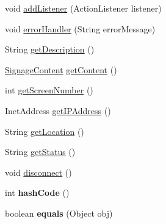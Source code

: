 \begin{DoxyCompactItemize}
\item 
void \hyperlink{classgov_1_1fnal_1_1ppd_1_1dd_1_1display_1_1DisplayImpl_ac26f8f2c8b7935585ee0c1f58a56ec4d}{add\-Listener} (Action\-Listener listener)
\item 
void \hyperlink{classgov_1_1fnal_1_1ppd_1_1dd_1_1display_1_1DisplayImpl_aef09d861c01a1be4e14a123d881bd211}{error\-Handler} (String error\-Message)
\item 
String \hyperlink{classgov_1_1fnal_1_1ppd_1_1dd_1_1display_1_1DisplayImpl_aa3ac511af5cffdea8fe664ec9f79e0c8}{get\-Description} ()
\item 
\hyperlink{interfacegov_1_1fnal_1_1ppd_1_1dd_1_1signage_1_1SignageContent}{Signage\-Content} \hyperlink{classgov_1_1fnal_1_1ppd_1_1dd_1_1display_1_1DisplayImpl_aa48e0f9679a07f8bff85867c4831d528}{get\-Content} ()
\item 
int \hyperlink{classgov_1_1fnal_1_1ppd_1_1dd_1_1display_1_1DisplayImpl_ac7077820239a58d29a1cb8d17666180e}{get\-Screen\-Number} ()
\item 
Inet\-Address \hyperlink{classgov_1_1fnal_1_1ppd_1_1dd_1_1display_1_1DisplayImpl_a76124d9580e72f645acb77257c033389}{get\-I\-P\-Address} ()
\item 
String \hyperlink{classgov_1_1fnal_1_1ppd_1_1dd_1_1display_1_1DisplayImpl_a092466ec2163d44dde2d737608360533}{get\-Location} ()
\item 
String \hyperlink{classgov_1_1fnal_1_1ppd_1_1dd_1_1display_1_1DisplayImpl_a3db5e11b8d5108d57d5027e0e8301e39}{get\-Status} ()
\item 
void \hyperlink{classgov_1_1fnal_1_1ppd_1_1dd_1_1display_1_1DisplayImpl_ab3982221fd0e7382f530b3c349121838}{disconnect} ()
\item 
\hypertarget{classgov_1_1fnal_1_1ppd_1_1dd_1_1display_1_1DisplayImpl_ad0c1ebb69cec1dfded07d014cc310bf0}{int {\bfseries hash\-Code} ()}\label{classgov_1_1fnal_1_1ppd_1_1dd_1_1display_1_1DisplayImpl_ad0c1ebb69cec1dfded07d014cc310bf0}

\item 
\hypertarget{classgov_1_1fnal_1_1ppd_1_1dd_1_1display_1_1DisplayImpl_a798cf0131dd1b3f20267f9aca0f12f60}{boolean {\bfseries equals} (Object obj)}\label{classgov_1_1fnal_1_1ppd_1_1dd_1_1display_1_1DisplayImpl_a798cf0131dd1b3f20267f9aca0f12f60}

\end{DoxyCompactItemize}
